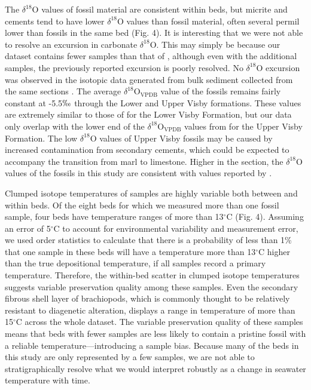 \documentclass[preprint, authoryear]{elsarticle}
\begin{document}
The $\delta^{18}$O values of fossil material are consistent within beds, but micrite and cements tend to have lower $\delta^{18}$O values than fossil material, often several permil lower than fossils in the same bed (Fig. 4). It is interesting that we were not able to resolve an excursion in carbonate $\delta^{18}$O. This may simply be because our dataset contains fewer samples than that of \cite{Munnecke2003}, although even with the additional samples, the previously reported excursion is poorly resolved. No $\delta^{18}$O excursion was observed in the isotopic data generated from bulk sediment collected from the same sections \citep{Fike2014}. The average $\delta^{18}$O$_{\text{VPDB}}$ value of the fossils remains fairly constant at -5.5$\permil$ through the Lower and Upper Visby formations. These values are extremely similar to those of \cite{Munnecke2003} for the Lower Visby Formation, but our data only overlap with the lower end of the $\delta^{18}$O$_{\text{VPDB}}$ values from \cite{Munnecke2003} for the Upper Visby Formation. The low $\delta^{18}$O values of Upper Visby fossils may be caused by increased contamination from secondary cements, which could be expected to accompany the transition from marl to limestone. Higher in the section, the $\delta^{18}$O values of the fossils in this study are consistent with values reported by \cite{Bickert1997}. 

Clumped isotope temperatures of samples are highly variable both between and within beds. Of the eight beds for which we measured more than one fossil sample, four beds have temperature ranges of more than 13$^{\circ}$C (Fig. 4). Assuming an error of 5$^{\circ}$C to account for environmental variability and measurement error, we used order statistics to calculate that there is a probability of less than 1\% that one sample in these beds will have a temperature more than 13$^{\circ}$C higher than the true depositional temperature, if all samples record a primary temperature. Therefore, the within-bed scatter in clumped isotope temperatures suggests variable preservation quality among these samples. Even the secondary fibrous shell layer of brachiopods, which is commonly thought to be relatively resistant to diagenetic alteration, displays a range in temperature of more than 15$^{\circ}$C across the whole dataset. The variable preservation quality of these samples means that beds with fewer samples are less likely to contain a pristine fossil with a reliable temperature---introducing a sample bias. Because many of the beds in this study are only represented by a few samples, we are not able to stratigraphically resolve what we would interpret robustly as a change in seawater temperature with time. 
\end{document}
